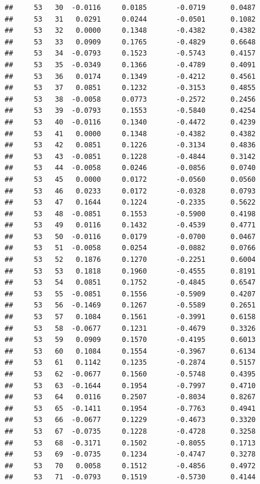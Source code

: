 \documentclass[
]{article}
\begin{document}
\begin{verbatim}
##     53   30  -0.0116     0.0185       -0.0719      0.0487  
##     53   31   0.0291     0.0244       -0.0501      0.1082  
##     53   32   0.0000     0.1348       -0.4382      0.4382  
##     53   33   0.0909     0.1765       -0.4829      0.6648  
##     53   34  -0.0793     0.1523       -0.5743      0.4157  
##     53   35  -0.0349     0.1366       -0.4789      0.4091  
##     53   36   0.0174     0.1349       -0.4212      0.4561  
##     53   37   0.0851     0.1232       -0.3153      0.4855  
##     53   38  -0.0058     0.0773       -0.2572      0.2456  
##     53   39  -0.0793     0.1553       -0.5840      0.4254  
##     53   40  -0.0116     0.1340       -0.4472      0.4239  
##     53   41   0.0000     0.1348       -0.4382      0.4382  
##     53   42   0.0851     0.1226       -0.3134      0.4836  
##     53   43  -0.0851     0.1228       -0.4844      0.3142  
##     53   44  -0.0058     0.0246       -0.0856      0.0740  
##     53   45   0.0000     0.0172       -0.0560      0.0560  
##     53   46   0.0233     0.0172       -0.0328      0.0793  
##     53   47   0.1644     0.1224       -0.2335      0.5622  
##     53   48  -0.0851     0.1553       -0.5900      0.4198  
##     53   49   0.0116     0.1432       -0.4539      0.4771  
##     53   50  -0.0116     0.0179       -0.0700      0.0467  
##     53   51  -0.0058     0.0254       -0.0882      0.0766  
##     53   52   0.1876     0.1270       -0.2251      0.6004  
##     53   53   0.1818     0.1960       -0.4555      0.8191  
##     53   54   0.0851     0.1752       -0.4845      0.6547  
##     53   55  -0.0851     0.1556       -0.5909      0.4207  
##     53   56  -0.1469     0.1267       -0.5589      0.2651  
##     53   57   0.1084     0.1561       -0.3991      0.6158  
##     53   58  -0.0677     0.1231       -0.4679      0.3326  
##     53   59   0.0909     0.1570       -0.4195      0.6013  
##     53   60   0.1084     0.1554       -0.3967      0.6134  
##     53   61   0.1142     0.1235       -0.2874      0.5157  
##     53   62  -0.0677     0.1560       -0.5748      0.4395  
##     53   63  -0.1644     0.1954       -0.7997      0.4710  
##     53   64   0.0116     0.2507       -0.8034      0.8267  
##     53   65  -0.1411     0.1954       -0.7763      0.4941  
##     53   66  -0.0677     0.1229       -0.4673      0.3320  
##     53   67  -0.0735     0.1228       -0.4728      0.3258  
##     53   68  -0.3171     0.1502       -0.8055      0.1713  
##     53   69  -0.0735     0.1234       -0.4747      0.3278  
##     53   70   0.0058     0.1512       -0.4856      0.4972  
##     53   71  -0.0793     0.1519       -0.5730      0.4144  

\end{verbatim}
\end{document}
